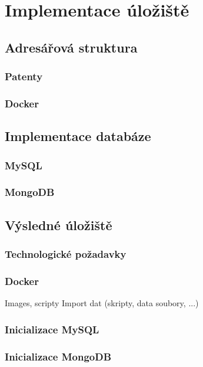 \chapter{Implementace úložiště}

\section{Adresářová struktura}
\subsection{Patenty}
\subsection{Docker}

\section{Implementace databáze}
\subsection{MySQL}
\subsection{MongoDB}

\section{Výsledné úložiště}
\subsection{Technologické požadavky}
\subsection{Docker}
Images, scripty \newline
Import dat (skripty, data soubory, ...) 
\subsection{Inicializace MySQL}
\subsection{Inicializace MongoDB}